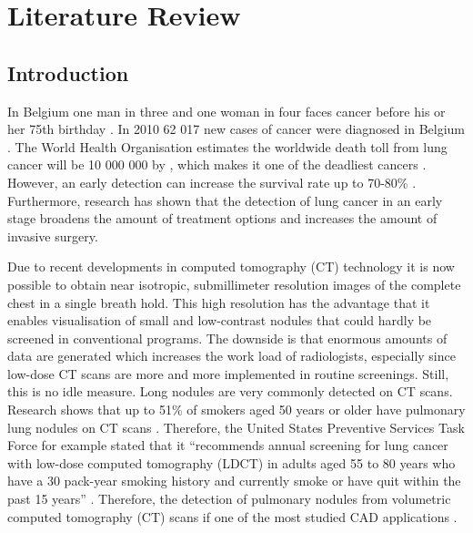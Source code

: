\section{Literature Review}
\subsection{Introduction}
In Belgium one man in three and one woman in four faces cancer before his or
her 75th birthday \cite{kanker}. In 2010 62 017 new cases of cancer were
diagnosed in Belgium \cite{kankerliga}. The World Health Organisation estimates
the worldwide death toll from lung cancer will be 10 000 000 by , which makes it
one of the deadliest cancers \cite{gu, zheng}.
However, an early detection can increase the survival rate up to 70-80\%
\cite{swensen}. Furthermore, research has shown that the detection of lung
cancer in an early stage broadens the amount of treatment options and increases
the amount of invasive surgery\cite{greenlee}.


Due to recent developments in
computed tomography (CT) technology it is now possible to obtain near isotropic,
submillimeter resolution images of the complete chest in a single breath hold.
This high resolution has the advantage that it enables visualisation of small
and low-contrast nodules that could hardly be screened in conventional
programs. The downside is that enormous amounts of data are generated
which increases the work load of radiologists, especially since low-dose CT
scans are more and more implemented in routine screenings. Still, this is no
idle measure. Long nodules are very commonly detected on CT scans. Research
shows that up to 51\% of smokers aged 50 years or older have pulmonary lung
nodules on CT scans \cite{mahon}. Therefore, the United States Preventive
Services Task Force for example stated that it ``recommends annual screening for
lung cancer with low-dose computed tomography (LDCT) in adults aged 55 to 80
years who have a 30 pack-year smoking history and currently smoke or have quit
within the past 15 years'' \cite{ups}.
Therefore, the detection of pulmonary nodules from volumetric computed
tomography (CT) scans if one of the most studied CAD applications
\cite{sluimer}.


